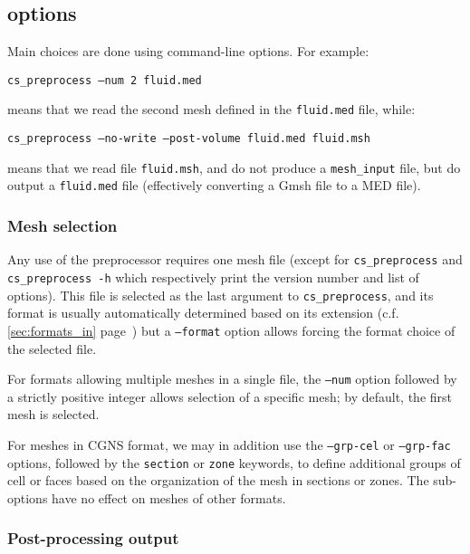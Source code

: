 {{{%
\subsection{\pcs options\label{sec:optpcs}}

Main choices are done using command-line options. For example:

\texttt{cs\_preprocess --num 2 fluid.med}

\noindent means that we read the second mesh defined in the
\texttt{fluid.med} file, while:

\texttt{cs\_preprocess --no-write --post-volume fluid.med fluid.msh}

\noindent means that we read file \texttt{fluid.msh}, and
do not produce a \texttt{mesh\_input}  file, but do output
a \texttt{fluid.med} file (effectively converting a Gmsh file to
a MED file).

\subsubsection{Mesh selection\label{sec:optpcs:mesh}}

Any use of the preprocessor requires one mesh file (except for
\texttt{cs\_preprocess} and \texttt{cs\_preprocess~-h} which respectively
print the version number and list of options).
This file is selected as the last argument to \texttt{cs\_preprocess},
and its format is usually automatically determined based on its
extension (c.f. \ref{sec:formats_in} page~\pageref{sec:formats_in})
but a \texttt{--format} option allows forcing the format choice of
the selected file.

For formats allowing multiple meshes in a single file, the
\texttt{--num} option followed by a strictly positive integer allows
selection of a specific mesh; by default, the first mesh is selected.

For meshes in CGNS format, we may in addition use the \texttt{--grp-cel}
or \texttt{--grp-fac} options, followed by the \texttt{section}
or \texttt{zone} keywords, to define additional groups of cell or faces
based on the organization of the mesh in sections or zones. The sub-options
have no effect on meshes of other formats.

\subsubsection{Post-processing output\label{sec:optpcs:post}}

}}}
